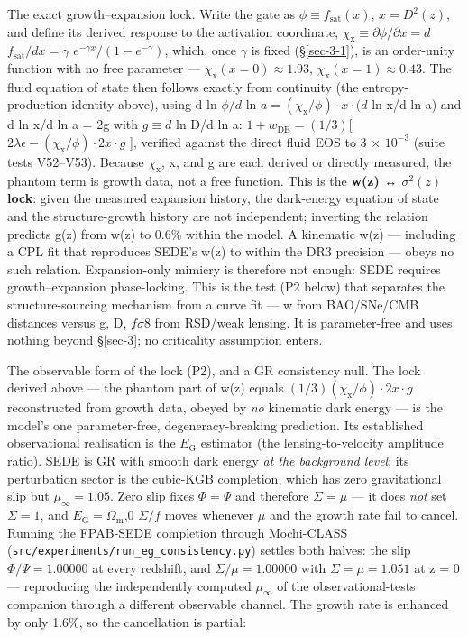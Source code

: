 \documentclass[preprint,12pt]{elsarticle}
\begin{document}
The exact growth--expansion lock. Write the gate as
\(\phi  \equiv  f_{\mathrm{sat}}(x)\), \(x = D^{2}(z)\), and define its
derived response to the activation coordinate,
\(\chi _{\mathrm{x}} \equiv  \partial \phi /\partial x = d\)
\(f_{\mathrm{sat}}/dx = \gamma\) \(e^{-\gamma x}/(1 - e^{-\gamma })\),
which, once \(\gamma\) is fixed (§\ref{sec-3-1}), is an order-unity
function with no free parameter ---
\(\chi _{\mathrm{x}}(x=0) \approx  1.93\),
\(\chi _{\mathrm{x}}(x=1) \approx  0.43\). The fluid equation of state
then follows exactly from continuity (the entropy-production identity
above), using d ln \(\phi /d\) ln
\(a = (\chi _{\mathrm{x}}/\phi )\cdot x\cdot (d\) ln x/d ln a) and d ln
x/d ln a = 2g with \(g \equiv  d\) ln D/d ln a:
\(1 + w_\mathrm{DE} = (1/3)[\)
\(2\lambda \epsilon  - (\chi _{\mathrm{x}}/\phi )\cdot 2x\cdot g\) {]},
verified against the direct fluid EOS to 3 × \(10^{-3}\) (suite tests
V52--V53). Because \(\chi _{\mathrm{x}}\), x, and g are each derived or
directly measured, the phantom term is growth data, not a free function.
This is the \textbf{w(z) ↔ \(\sigma ^{2}(z)\) lock}: given the measured
expansion history, the dark-energy equation of state and the
structure-growth history are not independent; inverting the relation
predicts g(z) from w(z) to 0.6\% within the model. A kinematic w(z) ---
including a CPL fit that reproduces SEDE's w(z) to within the DR3
precision --- obeys no such relation. Expansion-only mimicry is
therefore not enough: SEDE requires growth--expansion phase-locking.
This is the test (P2 below) that separates the structure-sourcing
mechanism from a curve fit --- w from BAO/SNe/CMB distances versus g, D,
\(f\sigma 8\) from RSD/weak lensing. It is parameter-free and uses
nothing beyond §\ref{sec-3}; no criticality assumption enters.

The observable form of the lock (P2), and a GR consistency null. The
lock derived above --- the phantom part of w(z) equals
\((1/3)(\chi _{\mathrm{x}}/\phi )\cdot 2x\cdot g\) reconstructed from
growth data, obeyed by \emph{no} kinematic dark energy --- is the
model's one parameter-free, degeneracy-breaking prediction. Its
established observational realisation is the \(E_{\mathrm{G}}\)
estimator (the lensing-to-velocity amplitude ratio). SEDE is GR with
smooth dark energy \emph{at the background level}; its perturbation
sector is the cubic-KGB completion, which has zero gravitational slip
but \(\mu _\infty  = 1.05\). Zero slip fixes \(\Phi  = \Psi\) and
therefore \textbf{\(\Sigma  = \mu\)} --- it does \emph{not} set
\(\Sigma  = 1\), and \(E_{\mathrm{G}} = \Omega _{\mathrm{m}}\),0
\(\Sigma /f\) moves whenever \(\mu\) and the growth rate fail to cancel.
Running the FPAB-SEDE completion through Mochi-CLASS
(\texttt{src/\allowbreak experiments/\allowbreak run\_\allowbreak eg\_\allowbreak consistency.\allowbreak py}) settles both halves:
the slip \(\Phi /\Psi  = 1.00000\) at every redshift, and
\(\Sigma /\mu  = 1.00000\) with \(\Sigma  = \mu  = 1.051\) at z = 0 ---
reproducing the independently computed \(\mu _\infty\) of the
observational-tests companion through a different observable channel.
The growth rate is enhanced by only 1.6\%, so the cancellation is
partial:
\end{document}

